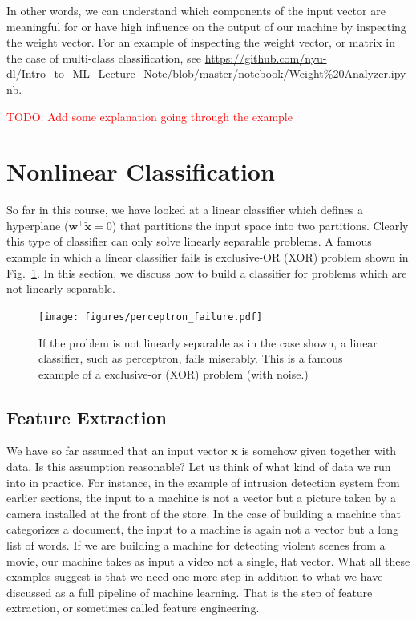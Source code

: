 \documentclass{report}
\newcommand{\vect}[1]{\mathbf{#1}}
\newcommand{\vx}[0]{\vect{x}}
\newcommand{\vw}[0]{\vect{w}}
\newcommand{\alert}[1]{\textcolor{red}{#1}}
\begin{document}
In other words, we can understand which components of the input vector are
meaningful for or have high influence on the output of our machine by inspecting
the weight vector. For an example of inspecting the weight vector, or matrix in
the case of multi-class classification, see
\url{https://github.com/nyu-dl/Intro_to_ML_Lecture_Note/blob/master/notebook/Weight%20Analyzer.ipynb}.

\alert{TODO: Add some explanation going through the example}


\section{Nonlinear Classification}

So far in this course, we have looked at a linear classifier which defines a
hyperplane ($\vw^\top \tilde{\vx} = 0$) that partitions the input space into two
partitions. Clearly this type of classifier can only solve linearly separable
problems. A famous example in which a linear classifier fails is exclusive-OR
(XOR) problem shown in Fig.~\ref{fig:perceptron_xor}. In this section, we
discuss how to build a classifier for problems which are not linearly separable.

\begin{figure}
    \centering
    \begin{minipage}{0.6\textwidth}
        \centering
        \texttt{[image: figures/perceptron\_failure.pdf]}
    \end{minipage}
    \begin{minipage}{0.39\textwidth}
        \caption{
            \label{fig:perceptron_xor}
            If the problem is not linearly separable as in the case shown, a
            linear classifier, such as perceptron, fails miserably. This is a
            famous example of a exclusive-or (XOR) problem (with noise.)
        }
    \end{minipage}
\end{figure}

\subsection{Feature Extraction}
\label{sec:feat}

We have so far assumed that an input vector $\vx$ is somehow given together with
data. Is this assumption reasonable? Let us think of what kind of data we run
into in practice. For instance, in the example of intrusion detection system
from earlier sections, the input to a machine is not a vector but a picture
taken by a camera installed at the front of the store. In the case of building a
machine that categorizes a document, the input to a machine is again not a
vector but a long list of words. If we are building a machine for detecting
violent scenes from a movie, our machine takes as input a video not a single,
flat vector. What all these examples suggest is that we need one more step in
addition to what we have discussed as a full pipeline of machine learning. That
is the step of feature extraction, or sometimes called feature engineering.
\end{document}
